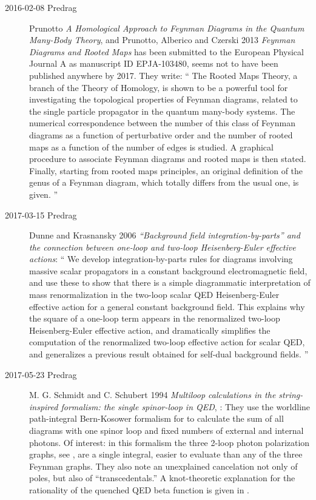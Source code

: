 \begin{description}
\item[2016-02-08  Predrag]
Prunotto
{\em A Homological Approach to Feynman Diagrams in the Quantum Many-Body Theory},
and
Prunotto, Alberico and Czerski 2013
{\em Feynman Diagrams and Rooted Maps}
has been submitted to the European Physical Journal A as manuscript ID EPJA-103480,
seems not to have been published anywhere by 2017.
They write: ``
The  Rooted Maps Theory, a branch of the Theory of Homology, is shown to be
a powerful tool for investigating  the topological properties of Feynman
diagrams, related to the single particle propagator in the quantum many-body
systems. The numerical correspondence between the number of this class of
Feynman diagrams as a function of perturbative order and the number of rooted
maps as a function of the number of edges is studied. A graphical procedure to
associate Feynman diagrams and rooted maps is then stated. Finally, starting
from rooted maps principles, an original definition of the genus of a
Feynman diagram, which totally differs from the usual one, is given.
''

\item[2017-03-15 Predrag]
Dunne and Krasnansky 2006 {\em ``Background field
integration-by-parts'' and the connection between one-loop and two-loop
{Heisenberg-Euler} effective actions}: ``
We develop integration-by-parts rules for diagrams involving massive
scalar propagators in a constant background electromagnetic field, and
use these to show that there is a simple diagrammatic interpretation of
mass renormalization in the two-loop scalar QED Heisenberg-Euler
effective action for a general constant background field. This explains
why the square of a one-loop term appears in the renormalized two-loop
Heisenberg-Euler effective action, and
dramatically simplifies the computation of the renormalized two-loop
effective action for scalar QED, and generalizes a previous result
obtained for self-dual background fields.
''

\item[2017-05-23 Predrag]
 \label{sect:SchSch96}
M. G. Schmidt and C. Schubert 1994
{\em Multiloop calculations in the string-inspired formalism: the single
spinor-loop in QED}, :
They use the worldline path-integral Bern-Kosower formalism
for to calculate the sum of all diagrams
with one spinor loop and fixed numbers of external and internal photons.
Of interest: in this formalism the three 2-loop photon polarization graphs,
see ,
are a single integral, easier to evaluate than any of the three Feynman
graphs. They also note an unexplained cancelation not only of poles, but also
of ``transcedentals.''
A knot-theoretic explanation for the rationality of the quenched
QED beta function is given in .


\end{description}
